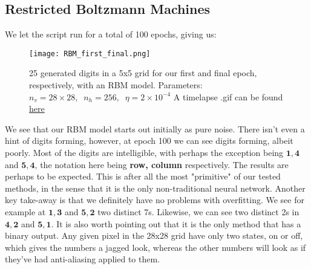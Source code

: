 \documentclass{article}
\begin{document}
\subsection{Restricted Boltzmann Machines}
We let the script run for a total of 100 epochs, giving us:
\begin{figure}[ht!]
    \centering
    \texttt{[image: RBM\_first\_final.png]}
    \caption{25 generated digits in a 5x5 grid for our first and final epoch, respectively, with an RBM model. \newline
    Parameters: $n_{v} = 28\times28, \; \; n_h = 256, \; \; \eta = 2\times10^{-4}$
    \newline 
    A timelapse .gif can be found \href{https://github.com/simloken/Generative_Imaging/blob/main/Figures/RBM_evolution.gif}{here}}
    \label{figRBM}
\end{figure}
\newline
We see that our RBM model starts out initially as pure noise. There isn't even a hint of digits forming, however, at epoch 100 we can see digits forming, albeit poorly. Most of the digits are intelligible, with perhaps the exception being $\mathbf{1,4}$ and $\mathbf{5,4}$, the notation here being \textbf{row, column} respectively.
\newline
The results are perhaps to be expected. This is after all the most "primitive" of our tested methods, in the sense that it is the only non-traditional neural network.\newline
Another key take-away is that we definitely have no problems with overfitting. We see for example at $\mathbf{1,3}$ and $\mathbf{5,2}$ two distinct 7s. Likewise, we can see two distinct 2s in $\mathbf{4,2}$ and $\mathbf{5,1}$.
\newline
It is also worth pointing out that it is the only method that has a binary output. Any given pixel in the 28x28 grid have only two states, on or off, which gives the numbers a jagged look, whereas the other numbers will look as if they've had anti-aliasing applied to them.
\newpage
\end{document}
